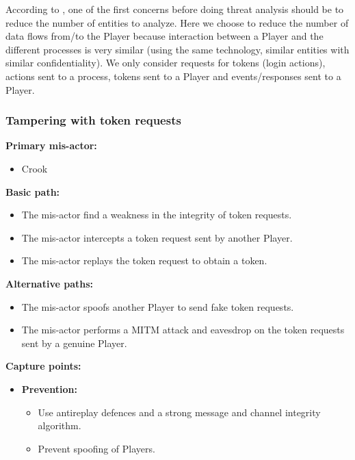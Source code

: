 \documentclass[a4paper,11pt]{report}
\begin{document}
According to \cite[p117]{1202957}, one of the first concerns before doing threat analysis should be to reduce the number of entities to analyze.
Here we choose to reduce the number of data flows from/to the Player because interaction between a Player and the different processes is very similar (using the same technology, similar entities with similar confidentiality). We only consider requests for tokens (login actions), actions sent to a process, tokens sent to a Player and events/responses sent to a Player.

\subsubsection{Tampering with token requests}
\label{PlayerFlowCasesT1}
\textbf{Primary mis-actor:}
\begin{itemize}
\item Crook
\end{itemize}
\textbf{Basic path:}
\begin{itemize}
\item The mis-actor find a weakness in the integrity of token requests.
\item The mis-actor intercepts a token request sent by another Player.
\item The mis-actor replays the token request to obtain a token.
\end{itemize}
\textbf{Alternative paths:}
\begin{itemize}
\item The mis-actor spoofs another Player to send fake token requests.
\item The mis-actor performs a MITM attack and eavesdrop on the token requests sent by a genuine Player.
\end{itemize}
\textbf{Capture points:}
\begin{itemize}
\item \textbf{Prevention:}
\begin{itemize}
\item Use antireplay defences and a strong message and channel integrity algorithm.
\item Prevent spoofing of Players.
\end{itemize}
\end{itemize}
\end{document}
